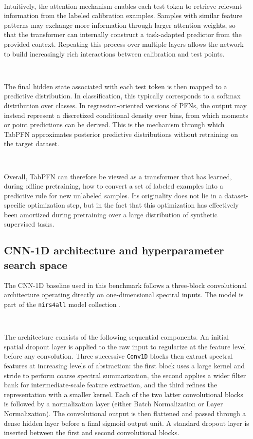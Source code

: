\documentclass{article}
\begin{document}
~

Intuitively, the attention mechanism enables each test token to retrieve relevant information from the labeled calibration examples. Samples with similar feature patterns may exchange more information through larger attention weights, so that the transformer can internally construct a task-adapted predictor from the provided context. Repeating this process over multiple layers allows the network to build increasingly rich interactions between calibration and test points.

~

The final hidden state associated with each test token is then mapped to a predictive distribution. In classification, this typically corresponds to a softmax distribution over classes. In regression-oriented versions of PFNs, the output may instead represent a discretized conditional density over bins, from which moments or point predictions can be derived. This is the mechanism through which TabPFN approximates posterior predictive distributions without retraining on the target dataset.

~


Overall, TabPFN can therefore be viewed as a transformer that has learned, during offline pretraining, how to convert a set of labeled examples into a predictive rule for new unlabeled samples. Its originality does not lie in a dataset-specific optimization step, but in the fact that this optimization has effectively been amortized during pretraining over a large distribution of synthetic supervised tasks.







\clearpage
\subsection{CNN-1D architecture and hyperparameter search space}

The CNN-1D baseline used in this benchmark follows a three-block convolutional architecture 
operating directly on one-dimensional spectral inputs. The model is part of the \texttt{nirs4all} model collection \cite{beurier2025nirs4all}.

~

The architecture consists of the following sequential components. An initial spatial dropout layer 
is applied to the raw input to regularize at the feature level before any convolution. Three 
successive \texttt{Conv1D} blocks then extract spectral features at increasing levels of 
abstraction: the first block uses a large kernel and stride to perform coarse spectral 
summarization, the second applies a wider filter bank for intermediate-scale feature extraction, 
and the third refines the representation with a smaller kernel. Each of the two latter 
convolutional blocks is followed by a normalization layer (either Batch Normalization or Layer 
Normalization). The convolutional output is then flattened and passed through a dense hidden 
layer before a final sigmoid output unit. A standard dropout layer is inserted between the first 
and second convolutional blocks.
\end{document}
